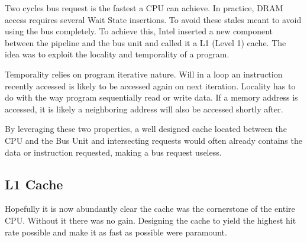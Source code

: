 Two cycles bus request is the fastest a CPU can achieve. In practice, DRAM access requires several Wait State insertions.
To avoid these stales meant to avoid using the bus completely. To achieve this, Intel inserted a new component between the pipeline and the bus unit and called it a L1 (Level 1) cache. The idea was to exploit the locality and temporality of a program.\\
\par
Temporality relies on program iterative nature. Will in a loop an instruction recently accessed is likely to be accessed again on next iteration. Locality has to do with the way program sequentially read or write data. If a memory address is accessed, it is likely a neighboring address will also be accessed shortly after.\\
\par
By leveraging these two properties, a well designed cache located between the CPU and the Bus Unit and intersecting requests would often already contains the data or instruction requested, making a bus request useless.\\
\par
{}




\subsection{L1 Cache}
Hopefully it is now abundantly clear the cache was the cornerstone of the entire CPU. Without it there was no gain. Designing the cache to yield the highest hit rate possible and make it as fast as possible were paramount. 

